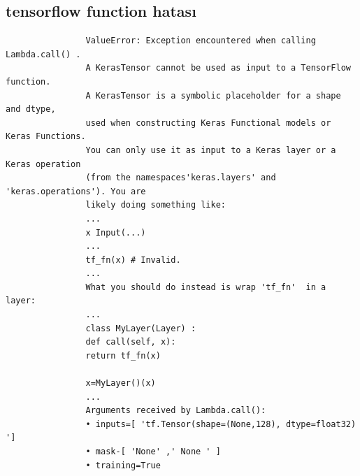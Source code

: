 \documentclass[12pt, a4paper]{article}
\begin{document}
			\subsection{tensorflow function hatası}
			\begin{verbatim}
				ValueError: Exception encountered when calling Lambda.call() .
				A KerasTensor cannot be used as input to a TensorFlow function. 
				A KerasTensor is a symbolic placeholder for a shape and dtype, 
				used when constructing Keras Functional models or Keras Functions. 
				You can only use it as input to a Keras layer or a Keras operation 
				(from the namespaces'keras.layers' and 'keras.operations'). You are 
				likely doing something like:
				...
				x Input(...)
				...
				tf_fn(x) # Invalid.
				...
				What you should do instead is wrap 'tf_fn'	in a layer:
				...
				class MyLayer(Layer) :
				def call(self, x):
				return tf_fn(x)
				
				x=MyLayer()(x)
				...
				Arguments received by Lambda.call():
				• inputs=[ 'tf.Tensor(shape=(None,128), dtype=float32) ']
				• mask-[ 'None' ,' None ' ]
				• training=True
			\end{verbatim}
\end{document}
